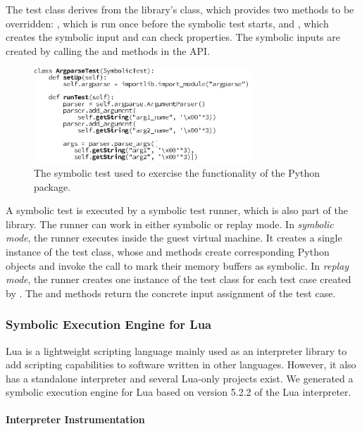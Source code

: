 The test class derives from the library's  class, which provides two methods to be overridden: , which is run once before the symbolic test starts, and , which creates the symbolic input and can check properties.  The symbolic inputs are created by calling the  and  methods in the  API.

\begin{figure}
  \centering
  \includegraphics[width=3.2in]{figures/evaluation/symtest}
  \caption{The symbolic test used to exercise the functionality of the Python  package.}
  \label{fig:sample-test}
\end{figure}

A symbolic test is executed by a symbolic test runner, which is also part of the library.  The runner can work in either symbolic or replay mode. 
%
In \emph{symbolic mode}, the runner executes inside the guest virtual machine.  It creates a single instance of the test class, whose  and  methods create corresponding Python objects and invoke the  call to mark their memory buffers as symbolic.
%
In \emph{replay mode}, the runner creates one instance of the test class for each test case created by \chef. The  and  methods return the concrete input assignment of the test case.


\subsubsection{Symbolic Execution Engine for Lua}
\label{sec:lua}

Lua is a lightweight scripting language mainly used as an interpreter library to add scripting capabilities to software written in other languages. However, it also has a standalone interpreter and several Lua-only projects exist. We generated a symbolic execution engine for Lua based on version 5.2.2 of the Lua interpreter.

\paragraph{Interpreter Instrumentation}

